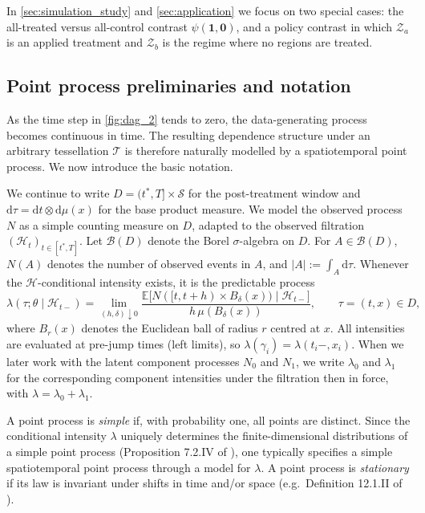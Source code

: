 \documentclass{statsoc}
\newcommand{\bbE}{\mathbb{E}}
\newcommand{\dd}{\mathrm{d}}
\newcommand{\1}{\mathbbm{1}}
\newcommand{\Fobs}{\mathcal H}
\newcommand{\Nproc}{N}
\newcommand{\Nzero}{N_0}
\newcommand{\None}{N_1}
\begin{document}
In \cref{sec:simulation_study} and \cref{sec:application} we focus on two special cases: the all-treated versus all-control contrast \(\psi(\bm{1},\bm{0})\), and a policy contrast in which \(\mathcal Z_a\) is an applied treatment and \(\mathcal Z_b\) is the regime where no regions are treated.


\subsection{Point process preliminaries and notation}\label{sec:notation}

As the time step in \cref{fig:dag_2} tends to zero, the data-generating process becomes continuous in time. The resulting dependence structure under an arbitrary tessellation \(\mathcal T\) is therefore naturally modelled by a spatiotemporal point process. We now introduce the basic notation.

We continue to write \(D=(t^\ast,T]\times\mathcal S\) for the post-treatment window and \(\dd\tau=\dd t\otimes\dd\mu(x)\) for the base product measure. We model the observed process \(\Nproc\) as a simple counting measure on \(D\), adapted to the observed filtration
\((\Fobs_t)_{t\in[t^\ast,T]}\). Let \(\mathcal B(D)\) denote the Borel \(\sigma\)-algebra on \(D\). For \(A\in\mathcal B(D)\), \(\Nproc(A)\) denotes the number of observed events in \(A\), and \(|A|:=\int_A \dd\tau\). Whenever the \(\Fobs\)-conditional intensity exists, it is the predictable process
\[
\lambda(\tau;\theta\mid\Fobs_{t-})
=\lim_{(h,\delta)\downarrow 0}
\frac{\bbE\big[\Nproc([t,t+h)\times B_\delta(x))\mid\Fobs_{t-}\big]}
{h\,\mu(B_\delta(x))},
\qquad \tau=(t,x)\in D,
\]
where \(B_r(x)\) denotes the Euclidean ball of radius \(r\) centred at \(x\). All intensities are evaluated at pre-jump times (left limits), so \(\lambda(\gamma_i)=\lambda(t_i-,x_i)\). When we later work with the latent component processes \(\Nzero\) and \(\None\), we write \(\lambda_0\) and \(\lambda_1\) for the corresponding component intensities under the filtration then in force, with \(\lambda=\lambda_0+\lambda_1\).


A point process is {\sl simple} if, with probability one, all points are distinct. Since the conditional intensity \(\lambda\) uniquely determines the finite-dimensional distributions of a simple point process (Proposition 7.2.IV of \citet{daley2003introduction}), one typically specifies a simple spatiotemporal point process through a model for \(\lambda\). A point process is {\sl stationary} if its law is invariant under shifts in time and/or space (e.g.\ Definition 12.1.II of \citet{daley2007introduction}).
\end{document}
